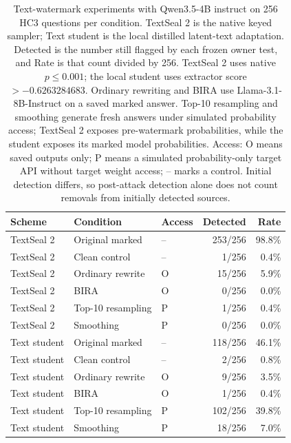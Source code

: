 \begin{table}[t]\centering\small
\begin{tabular}{lllrr}\toprule
Scheme & Condition & Access & Detected & Rate\\\midrule
TextSeal 2 & Original marked & -- & 253/256 & 98.8\% \\
TextSeal 2 & Clean control & -- & 1/256 & 0.4\% \\
TextSeal 2 & Ordinary rewrite & O & 15/256 & 5.9\% \\
TextSeal 2 & BIRA & O & 0/256 & 0.0\% \\
TextSeal 2 & Top-10 resampling & P & 1/256 & 0.4\% \\
TextSeal 2 & Smoothing & P & 0/256 & 0.0\% \\
Text student & Original marked & -- & 118/256 & 46.1\% \\
Text student & Clean control & -- & 2/256 & 0.8\% \\
Text student & Ordinary rewrite & O & 9/256 & 3.5\% \\
Text student & BIRA & O & 1/256 & 0.4\% \\
Text student & Top-10 resampling & P & 102/256 & 39.8\% \\
Text student & Smoothing & P & 18/256 & 7.0\% \\
\bottomrule\end{tabular}
\caption{Text-watermark experiments with Qwen3.5-4B instruct on 256 HC3 questions per condition. TextSeal 2 is the native keyed sampler; Text student is the local distilled latent-text adaptation. Detected is the number still flagged by each frozen owner test, and Rate is that count divided by 256. TextSeal 2 uses native $p\leq0.001$; the local student uses extractor score $>-0.6263284683$. Ordinary rewriting and BIRA use Llama-3.1-8B-Instruct on a saved marked answer. Top-10 resampling and smoothing generate fresh answers under simulated probability access; TextSeal 2 exposes pre-watermark probabilities, while the student exposes its marked model probabilities. Access: O means saved outputs only; P means a simulated probability-only target API without target weight access; -- marks a control. Initial detection differs, so post-attack detection alone does not count removals from initially detected sources.}\end{table}
